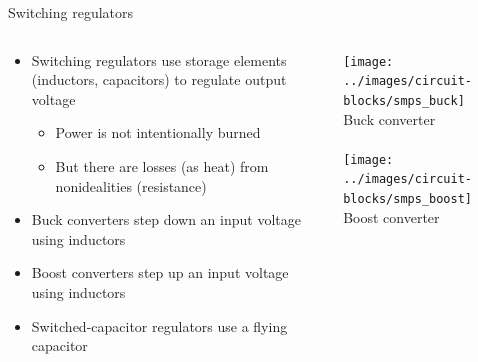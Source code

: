 \documentclass{beamer}
\begin{document}
\begin{frame}{Switching regulators}
  \begin{columns}[T]
    \begin{column}{.6\textwidth}
      \begin{itemize}
        \item Switching regulators use storage elements (inductors, capacitors) to regulate output voltage
        \begin{itemize}
          \item Power is not intentionally burned
          \item But there are losses (as heat) from nonidealities (resistance)
        \end{itemize}
        \item Buck converters step down an input voltage using inductors
        \item Boost converters step up an input voltage using inductors
        \item Switched-capacitor regulators use a flying capacitor
      \end{itemize}
    \end{column}

    \begin{column}{0.4\textwidth} \centering
      \texttt{[image: ../images/circuit-blocks/smps\_buck]} \\
      Buck converter \\
      ~ \\
      \texttt{[image: ../images/circuit-blocks/smps\_boost]} \\
      Boost converter
    \end{column}
  \end{columns}
\end{frame}
\end{document}
